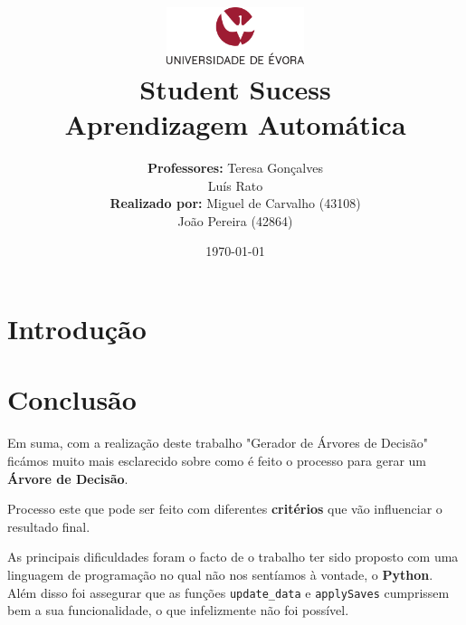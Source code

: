 \documentclass[11pt]{article}   %
\title
{
    \includegraphics[width=0.3\textwidth]{images/logo_universidade.png}
    \\[0.1cm]
    \textbf{Student Sucess} \\
    Aprendizagem Automática
}
\author
{
    \textbf{Professores:} Teresa Gonçalves \\ Luís Rato \\
    \textbf{Realizado por:} Miguel de Carvalho (43108) \\ João Pereira (42864) 
}
\date{\today}
\begin{document}
\maketitle

\section{Introdução} 


\section{Conclusão} %
\hspace{0,5cm}Em suma, com a realização deste trabalho "Gerador de Árvores de Decisão" ficámos muito mais esclarecido sobre como é
feito o processo para gerar um \textbf{Árvore de Decisão}. \par
Processo este que pode ser feito com diferentes \textbf{critérios} que vão influenciar o resultado final.

As principais dificuldades foram o facto de o trabalho ter sido proposto com uma linguagem de programação no qual não nos
sentíamos à vontade, o \textbf{Python}.
Além disso foi assegurar que as funções \verb|update_data| e \verb|applySaves| cumprissem bem a sua funcionalidade, o que infelizmente não
foi possível.
\end{document}
